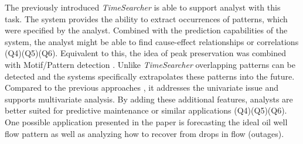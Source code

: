 \documentclass[electronic]{vgtc}             %
\begin{document}
The previously introduced \textit{TimeSearcher} \cite{buono:2007} is able to support analyst with this task.
The system provides the ability to extract occurrences of patterns, which were specified by the analyst. 
Combined with the prediction capabilities of the system, the analyst might be able to find cause-effect relationships or correlations (Q4)(Q5)(Q6).
Equivalent to this, the idea of peak preservation \cite{Hao:2009, Hao:2011} was combined with Motif/Pattern detection \cite{Hao:2012}.
Unlike \textit{TimeSearcher} \cite{buono:2007} overlapping patterns can be detected and the systems specifically extrapolates these patterns into the future.
Compared to the previous approaches \cite{Hao:2009, Hao:2011}, it addresses the univariate issue and supports multivariate analysis. 
By adding these additional features, analysts are better suited for predictive maintenance or similar applications (Q4)(Q5)(Q6). 
One possible application presented in the paper is forecasting the ideal oil well flow pattern as well as analyzing how to recover from drops in flow (outages).   
\end{document}
